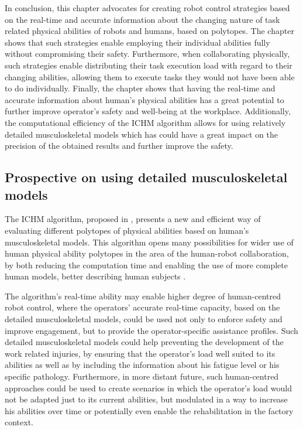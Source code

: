 In conclusion, this chapter advocates for creating robot control strategies based on the real-time and accurate information about the changing nature of task related physical abilities of robots and humans, based on polytopes. The chapter shows that such strategies enable employing their individual abilities fully without compromising their safety. Furthermore, when collaborating physically, such strategies enable distributing their task execution load with regard to their changing abilities, allowing them to execute tasks they would not have been able to do individually. Finally, the chapter shows that having the real-time and accurate information about human's physical abilities has a great potential to further improve operator's safety and well-being at the workplace. Additionally, the computational efficiency of the ICHM algorithm allows for using relatively detailed musculoskeletal models which has could have a great impact on the precision of the obtained results and further improve the safety. 

\subsection{Prospective on using detailed musculoskeletal models}
\label{sec:human_robot_prospective}

The ICHM algorithm, proposed in , presents a new and efficient way of evaluating different polytopes of physical abilities based on human's musculoskeletal models. This algorithm opens many possibilities for wider use of human physical ability polytopes in the area of the human-robot collaboration, by both reducing the computation time and enabling the use of more complete human models, better describing human subjects \cite{sohn2019effects}. 

The algorithm's real-time ability may enable higher degree of human-centred robot control, where the operators' accurate real-time capacity, based on the detailed musculoskeletal models, could be used not only to enforce safety and improve engagement, but to provide the operator-specific assistance profiles. Such detailed musculoskeletal models could help preventing the development of the work related injuries, by ensuring that the operator's load well suited to its abilities as well as by including the information about his fatigue level \cite{Bolghanabadi2014fatigue} or his specific pathology. Furthermore, in more distant future, such human-centred approaches could be used to create scenarios in which the operator's load would not be adapted just to its current abilities, but modulated in a way to increase his abilities over time or potentially even enable the rehabilitation in the factory context. 

